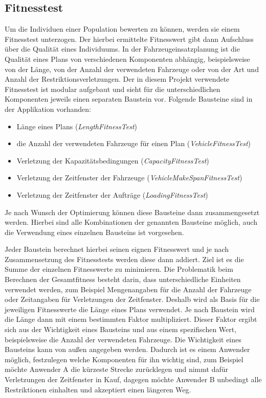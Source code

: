 \subsection{Fitnesstest}
\label{sec:Fitnesstest}
Um die Individuen einer Population bewerten zu können, werden sie einem Fitnesstest unterzogen. Der hierbei ermittelte Fitnesswert gibt dann Aufschluss über die Qualität eines Individuums. In der Fahrzeugeinsatzplanung ist die Qualität eines Plans von verschiedenen Komponenten abhängig, beispielsweise von der Länge, von der Anzahl der verwendeten Fahrzeuge oder von der Art und Anzahl der Restriktionsverletzungen. Der in diesem Projekt verwendete Fitnesstest ist modular aufgebaut und sieht für die unterschiedlichen Komponenten jeweils einen separaten Baustein vor. Folgende Bausteine sind in der Applikation vorhanden:
\begin{itemize}
 \item Länge eines Plans ({\slshape{LengthFitnessTest}})
 \item die Anzahl der verwendeten Fahrzeuge für einen Plan ({\slshape{VehicleFitnessTest}})
 \item Verletzung der Kapazitätsbedingungen ({\slshape{CapacityFitnessTest}})
 \item Verletzung der Zeitfenster der Fahrzeuge ({\slshape{VehicleMakeSpanFitnessTest}})
 \item Verletzung der Zeitfenster der Aufträge ({\slshape{LoadingFitnessTest}})
\end{itemize}
Je nach Wunsch der Optimierung können diese Bausteine dann zusammengesetzt werden. Hierbei sind alle Kombinationen der genannten Bausteine möglich, auch die Verwendung eines einzelnen Bausteins ist vorgesehen.

Jeder Baustein berechnet hierbei seinen eignen Fitnesswert und je nach Zusammensetzung des Fitnesstests werden diese dann addiert. Ziel ist es die Summe der einzelnen Fitnesswerte zu minimieren. Die Problematik beim Berechnen der Gesamtfitness besteht darin, dass unterschiedliche Einheiten verwendet werden, zum Beispiel Mengenangaben für die Anzahl der Fahrzeuge oder Zeitangaben für Verletzungen der Zeitfenster. Deshalb wird als Basis für die jeweiligen Fitnesswerte die Länge eines Plans verwendet. Je nach Baustein wird die Länge dann mit einem bestimmten Faktor multipliziert. Dieser Faktor ergibt sich aus der Wichtigkeit eines Bausteins und aus einem spezifischen Wert, beispielsweise die Anzahl der verwendeten Fahrzeuge. Die Wichtigkeit eines Bausteins kann von außen angegeben werden. Dadurch ist es einem Anwender möglich, festzulegen welche Komponenten für ihn wichtig sind, zum Beispiel möchte Anwender A die kürzeste Strecke zurücklegen und nimmt dafür Verletzungen der Zeitfenster in Kauf, dagegen möchte Anwender B unbedingt alle Restriktionen einhalten und akzeptiert einen längeren Weg.

